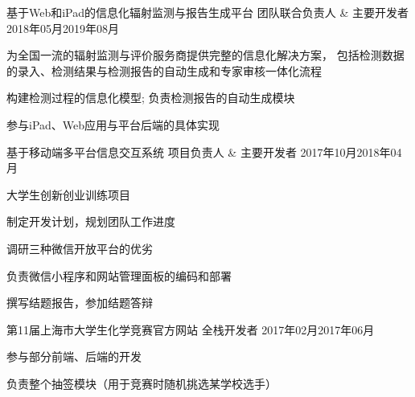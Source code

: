 
\begin{projitem}
    {基于Web和iPad的信息化辐射监测与报告生成平台}
    {团队联合负责人 \& 主要开发者}
    {2018年05月}{2019年08月}
    \item 为全国一流的辐射监测与评价服务商提供完整的信息化解决方案，
        包括检测数据的录入、检测结果与检测报告的自动生成和专家审核一体化流程
    \item 构建检测过程的信息化模型; 负责检测报告的自动生成模块
    \item 参与iPad、Web应用与平台后端的具体实现
\end{projitem}

\begin{projitem}
    {基于移动端多平台信息交互系统}
    {项目负责人 \& 主要开发者}
    {2017年10月}{2018年04月}
    \item 大学生创新创业训练项目
    \item 制定开发计划，规划团队工作进度
    \item 调研三种微信开放平台的优劣
    \item 负责微信小程序和网站管理面板的编码和部署
    \item 撰写结题报告，参加结题答辩
\end{projitem}

\begin{projitem}
    {第11届上海市大学生化学竞赛官方网站}
    {全栈开发者}
    {2017年02月}{2017年06月}
    \item 参与部分前端、后端的开发
    \item 负责整个抽签模块（用于竞赛时随机挑选某学校选手）
\end{projitem}

\endinput